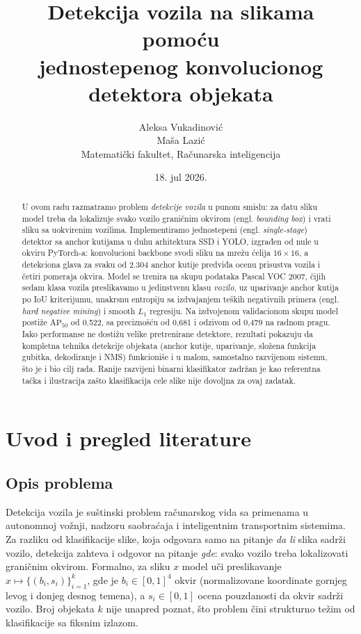 \documentclass[11pt,a4paper]{article}
\title{Detekcija vozila na slikama pomoću\\jednostepenog konvolucionog detektora objekata}
\author{Aleksa Vukadinović\\Maša Lazić\\Matematički fakultet, Računarska inteligencija}
\date{18. jul 2026.}
\begin{document}
\maketitle

\begin{abstract}
U ovom radu razmatramo problem \emph{detekcije vozila} u punom smislu: za datu
sliku model treba da lokalizuje svako vozilo graničnim okvirom (engl.
\emph{bounding box}) i vrati sliku sa uokvirenim vozilima. Implementiramo
jednostepeni (engl. \emph{single-stage}) detektor sa anchor kutijama u duhu
arhitektura SSD i YOLO, izgrađen od nule u okviru PyTorch-a: konvolucioni
backbone svodi sliku na mrežu ćelija $16\times16$, a detekciona glava za
svaku od 2.304 anchor kutije predviđa ocenu prisustva vozila i četiri
pomeraja okvira. Model se trenira na skupu podataka Pascal VOC 2007, čijih
sedam klasa vozila preslikavamo u jedinstvenu klasu \emph{vozilo}, uz uparivanje
anchor kutija po IoU kriterijumu, unakrsnu entropiju sa izdvajanjem teških
negativnih primera (engl. \emph{hard negative mining}) i smooth $L_1$ regresiju.
Na izdvojenom validacionom skupu model postiže $\mathrm{AP}_{50}$ od 0,522,
sa preciznošću od 0,681 i odzivom od 0,479 na radnom pragu. Iako
performanse ne dostižu velike pretrenirane detektore, rezultati pokazuju da
kompletna tehnika detekcije objekata (anchor kutije, uparivanje, složena
funkcija gubitka, dekodiranje i NMS) funkcioniše i u malom, samostalno
razvijenom sistemu, što je i bio cilj rada. Ranije razvijeni binarni
klasifikator zadržan je kao referentna tačka i ilustracija zašto
klasifikacija cele slike nije dovoljna za ovaj zadatak.
\end{abstract}

\tableofcontents

\section{Uvod i pregled literature}

\subsection{Opis problema}

Detekcija vozila je suštinski problem računarskog vida sa primenama u
autonomnoj vožnji, nadzoru saobraćaja i inteligentnim transportnim
sistemima. Za razliku od klasifikacije slike, koja odgovara samo na pitanje
\emph{da li} slika sadrži vozilo, detekcija zahteva i odgovor na pitanje
\emph{gde}: svako vozilo treba lokalizovati graničnim okvirom. Formalno, za
sliku $x$ model uči preslikavanje
$x \mapsto \{(b_i, s_i)\}_{i=1}^{k}$, gde je $b_i \in [0,1]^4$ okvir
(normalizovane koordinate gornjeg levog i donjeg desnog temena), a
$s_i \in [0,1]$ ocena pouzdanosti da okvir sadrži vozilo. Broj objekata $k$
nije unapred poznat, što problem čini strukturno težim od
klasifikacije sa fiksnim izlazom.
\end{document}

